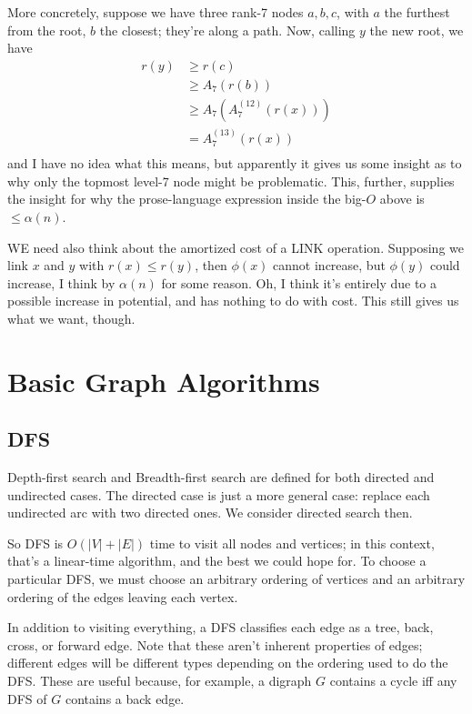 \documentclass{article}
\begin{document}
More concretely, suppose we have three rank-7 nodes $a,b,c$, with 
$a$ the furthest from the root, $b$ the closest; they're along a path.
Now, calling $y$ the new root, we have
\begin{align*}
	r(y) &\geq r(c) \\
&	\geq A_7(r(b)) \\
	&\geq A_7(A_7^{(12)}(r(x))) \\
	&= A_7^{(13)}(r(x)) \\
\end{align*}
and I have no idea what this means, but apparently it gives us some
insight as to why only the topmost level-7 node might be problematic.
This, further, supplies the insight for why the prose-language expression
inside the big-$O$ above is $\leq\alpha(n)$.

WE need also think about the amortized cost of a LINK operation.
Supposing we link $x$ and $y$ with $r(x) \leq r(y)$, then $\phi(x)$ cannot
increase, but $\phi(y)$ could increase, I think by $\alpha(n)$ for some
reason.
Oh, I think it's entirely due to a possible increase in potential, and has
nothing to do with cost.
This still gives us what we want, though.



\section{Basic Graph Algorithms}

\subsection{DFS}

Depth-first search and Breadth-first search are defined for both directed
and undirected cases.
The directed case is just a more general case: replace each undirected
arc with two directed ones.
We consider directed search then.

So DFS is $O(|V| + |E|)$ time to visit all nodes and vertices; in this context,
that's a linear-time algorithm, and the best we could hope for.
To choose a particular DFS, we must choose an arbitrary ordering of vertices 
and an arbitrary ordering of the edges leaving each vertex.

In addition to visiting everything, a DFS classifies each edge
as a tree, back, cross, or forward edge. Note that these aren't inherent
properties of edges; different edges will be different types depending
on the ordering used to do the DFS.
These are useful because, for example, a digraph $G$ contains
a cycle iff any DFS of $G$ contains a back edge.
\end{document}
